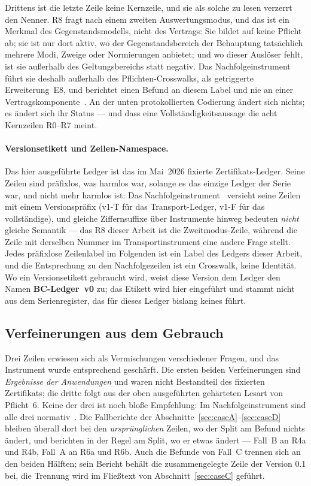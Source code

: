 \documentclass[11pt,a4paper]{article}
\theoremstyle{definition}
\begin{document}
Drittens ist die letzte Zeile keine Kernzeile, und sie als solche zu lesen
verzerrt den Nenner. R8 fragt nach einem zweiten Auswertungsmodus, und das ist
ein Merkmal des Gegenstandsmodells, nicht des Vertrags: Sie bildet auf keine
Pflicht ab; sie ist nur dort aktiv, wo der Gegenstandsbereich der Behauptung
tatsächlich mehrere Modi, Zweige oder Normierungen anbietet; und wo dieser
Auslöser fehlt, ist sie außerhalb des Geltungsbereichs statt negativ. Das
Nachfolgeinstrument führt sie deshalb außerhalb des Pflichten-Crosswalks, als
getriggerte Erweiterung~E8, und berichtet einen Befund an diesem Label und nie an
einer Vertragskomponente~\cite{GeigerBCM2026}. An der unten protokollierten
Codierung ändert sich nichts; es ändert sich ihr Status --- und dass eine
Vollständigkeitsaussage die acht Kernzeilen R0--R7 meint.

\paragraph{Versionsetikett und Zeilen-Namespace.} Das hier ausgeführte Ledger ist
das im Mai~2026 fixierte Zertifikats-Ledger. Seine Zeilen sind präfixlos, was
harmlos war, solange es das einzige Ledger der Serie war, und nicht mehr harmlos
ist: Das Nachfolgeinstrument~\cite{GeigerBCM2026} versieht seine Zeilen mit einem
Versionspräfix (v1-T für das Transport-Ledger, v1-F für das vollständige), und
gleiche Ziffernsuffixe über Instrumente hinweg bedeuten \emph{nicht} gleiche
Semantik --- das R8 dieser Arbeit ist die Zweitmodus-Zeile, während die Zeile mit
derselben Nummer im Transportinstrument eine andere Frage stellt. Jedes präfixlose
Zeilenlabel im Folgenden ist ein Label des Ledgers dieser Arbeit, und die
Entsprechung zu den Nachfolgezeilen ist ein Crosswalk, keine Identität. Wo ein
Versionsetikett gebraucht wird, weist diese Version dem Ledger den Namen
\textbf{BC-Ledger~v0} zu; das Etikett wird hier eingeführt und stammt nicht aus
dem Serienregister, das für dieses Ledger bislang keines führt.

\subsection{Verfeinerungen aus dem Gebrauch}
\label{sec:splits}

Drei Zeilen erwiesen sich als Vermischungen verschiedener Fragen, und das
Instrument wurde entsprechend geschärft. Die ersten beiden Verfeinerungen sind
\emph{Ergebnisse der Anwendungen} und waren nicht Bestandteil des fixierten
Zertifikats; die dritte folgt aus der oben ausgeführten gehärteten Lesart von
Pflicht~6. Keine der drei ist noch bloße Empfehlung: Im Nachfolgeinstrument sind
alle drei normativ~\cite{GeigerBCM2026}. Die Fallberichte der
Abschnitte~\ref{sec:caseA}--\ref{sec:caseD} bleiben überall dort bei den
\emph{ursprünglichen} Zeilen, wo der Split am Befund nichts ändert, und berichten in der Regel
am Split, wo er etwas ändert --- Fall~B an R4a und R4b, Fall~A an R6a und R6b.
Auch die Befunde von Fall~C trennen sich an den beiden Hälften; sein Bericht
behält die zusammengelegte Zeile der Version 0.1 bei, die Trennung wird im
Fließtext von Abschnitt~\ref{sec:caseC} geführt.
\end{document}
